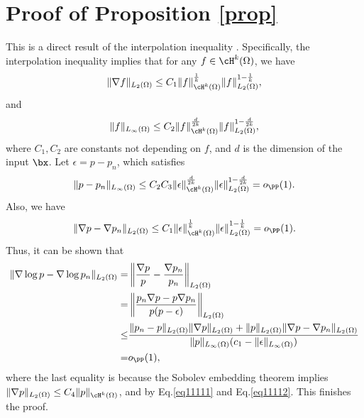 \documentclass{article}
\theoremstyle{definition}
\begin{document}
\section{Proof of Proposition \ref{prop}}
This is a direct result of the interpolation inequality \citep{BrezisMironescu19}. Specifically, the interpolation inequality implies that for any $f\in \cH^k(\Omega)$, we have
\begin{align*}
    \|\nabla f\|_{L_2(\Omega)} \leq C_1 \|f\|_{\cH^k(\Omega)}^{\frac{1}{k}}\|f\|_{L_2(\Omega)}^{1-\frac{1}{k}},
\end{align*}
and
\begin{align*}
    \|f\|_{L_\infty(\Omega)} \leq C_2 \|f\|_{\cH^k(\Omega)}^{\frac{d}{2k}}\|f\|_{L_2(\Omega)}^{1-\frac{d}{2k}},
\end{align*}
where $C_1,C_2$ are constants not depending on $f$, and $d$ is the dimension of the input $\bx$. Let $\epsilon = p - p_n$, which satisfies 
\begin{align}\label{eq11111}
    \|p - p_n\|_{L_\infty(\Omega)} \leq C_2 C_3\|\epsilon\|_{\cH^k(\Omega)}^{\frac{d}{2k}}\|\epsilon\|_{L_2(\Omega)}^{1-\frac{d}{2k}} = o_{\PP}(1).
\end{align}
Also, we have
\begin{align}\label{eq11112}
    \|\nabla p - \nabla p_n\|_{L_2(\Omega)} \leq C_1 \|\epsilon\|_{\cH^k(\Omega)}^{\frac{1}{k}}\|\epsilon\|_{L_2(\Omega)}^{1-\frac{1}{k}}= o_{\PP}(1).
\end{align}
Thus, it can be shown that
\begin{align*}
    \|\nabla \log p - \nabla \log p_n\|_{L_2(\Omega)} = & \left\|\frac{\nabla p}{p} - \frac{\nabla  p_n}{p_n}\right\|_{L_2(\Omega)}\\
    = & \left\|\frac{p_n\nabla p - p\nabla p_n}{p(p - \epsilon)}\right\|_{L_2(\Omega)}\\
    \leq & \frac{\|p_n - p\|_{L_2(\Omega)}\|\nabla p\|_{L_2(\Omega)} + \|p\|_{L_2(\Omega)}\|\nabla p - \nabla p_n\|_{L_2(\Omega)}}{\|p\|_{L_\infty(\Omega)}(c_1 - \|\epsilon\|_{L_\infty(\Omega)})}\\
    = & o_{\PP}(1),
\end{align*}
where the last equality is because the Sobolev embedding theorem implies $\|\nabla p\|_{L_2(\Omega)}\leq C_4\|p\|_{\cH^k(\Omega)}$, and by Eq.\ref{eq11111} and Eq.\ref{eq11112}. This finishes the proof. 
\end{document}
